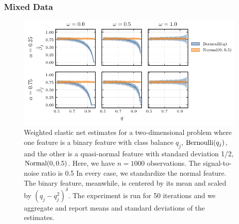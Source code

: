 \subsubsection{Mixed Data}\label{sec:experiments-mixed-data-elasticnet}

\begin{figure}[htpb]
  \centering
  \includegraphics{plots/mixed_data_elnet.pdf}
  \caption{%
    Weighted elastic net estimates for a two-dimensional problem where one feature is a binary
    feature with class balance \(q_j\), \(\operatorname{Bernoulli}(q_j)\), and the other is a quasi-normal
    feature with standard deviation 1/2, \(\operatorname{Normal}(0, 0.5)\). Here, we have \(n = \num{1000}\)
    observations. The signal-to-noise ratio is 0.5 In every case, we standardize the normal
    feature. The binary feature, meanwhile, is centered by its mean and scaled by
    \((q_j-q_j^2)^\delta\). The experiment is run for 50 iterations and we aggregate and report
    means and standard deviations of the estimates. \label{fig:mixed-data-elnet}
  }
\end{figure}

